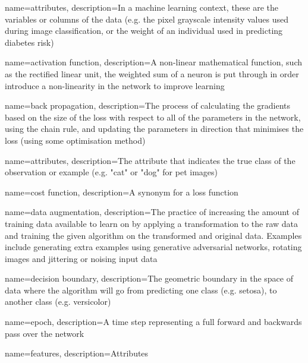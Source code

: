 
{
    name=attributes,
    description={In a machine learning context, these are the variables or columns of the data (e.g. the pixel grayscale intensity values used during image classification, or the weight of an individual used in predicting diabetes risk)}
}

{
    name=activation function,
    description={A non-linear mathematical function, such as the rectified linear unit, the weighted sum of a neuron is put through in order introduce a non-linearity in the network to improve learning}
}

{
    name=back propagation,
    description={The process of calculating the gradients based on the size of the loss with respect to all of the parameters in the network, using the chain rule, and updating the parameters in direction that minimises the loss (using some optimisation method)}
}

{
    name=attributes,
    description={The attribute that indicates the true class of the observation or example (e.g. "cat" or "dog" for pet images)}
}

{
    name={cost function},
    description={A synonym for a loss function \cite[p.~80]{good_fellow_2016}}
}

{
    name=data augmentation,
    description={The practice of increasing the amount of training data available to learn on by applying a transformation to the raw data and training the given algorithm on the transformed and original data. Examples include generating extra examples using generative adversarial networks, rotating images and jittering or noising input data}
}

{
    name=decision boundary,
    description={The geometric boundary in the space of data where the algorithm will go from predicting one class (e.g. setosa), to another class (e.g. versicolor)}
}

{
    name=epoch,
    description={A time step representing a full forward and backwards pass over the network}
}

{
    name=features,
    description={Attributes}
}

